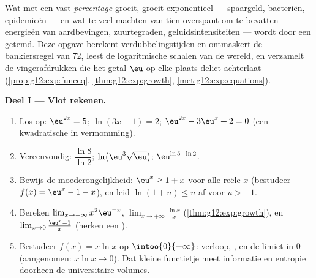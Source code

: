 \begin{problem}
\label{pb:g12:exp:1}
Wat met een vast \emph{percentage} groeit, groeit exponentieel --- spaargeld,
bacteriën, epidemieën --- en wat te veel machten van tien overspant om te
bevatten --- energieën van aardbevingen, zuurtegraden, geluidsintensiteiten
--- wordt door een  getemd. Deze opgave berekent
verdubbelingstijden en ontmaskert de bankiersregel van 72, leest de
logaritmische schalen van de wereld, en verzamelt de vingerafdrukken die het
getal $\eu$ op elke plaats delict achterlaat
(\cref{prop:g12:exp:funceq}, \cref{thm:g12:exp:growth},
\cref{met:g12:exp:equations}).

\medskip
\noindent\textbf{Deel I --- Vlot rekenen.}
\begin{enumerate}
  \item Los op: $\eu^{2x} = 5$; \quad $\ln(3x - 1) = 2$; \quad
        $\eu^{2x} - 3\eu^x + 2 = 0$ (een kwadratische  in
        vermomming).
  \item Vereenvoudig: $\dfrac{\ln 8}{\ln 2}$; \quad
        $\ln\!\left(\eu^3 \sqrt{\eu}\right)$; \quad $\eu^{\ln 5 - \ln 2}$.
  \item Bewijs de moederongelijkheid: $\eu^x \geq 1 + x$ voor alle reële $x$
        (bestudeer $f(x) = \eu^x - 1 - x$), en leid $\ln(1 + u) \leq u$ af
        voor $u > -1$.
  \item Bereken $\lim_{x \to +\infty} x^2 \eu^{-x}$,
        $\lim_{x \to +\infty} \frac{\ln x}{x}$
        (\cref{thm:g12:exp:growth}), en
        $\lim_{x \to 0} \frac{\eu^x - 1}{x}$ (herken een ).
  \item Bestudeer $f(x) = x \ln x$ op $\intoo{0}{+\infty}$: verloop, ,
        en de limiet in $0^+$ (aangenomen: $x \ln x \to 0$). Dat kleine
        functietje meet informatie en entropie doorheen de universitaire
        volumes.
\end{enumerate}


\end{problem}

